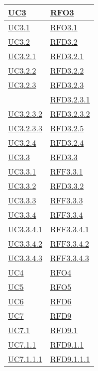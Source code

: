 \begin{longtable}{|>{\centering}m{5cm}|m{5cm}<{\centering}|}
\hyperref[UC3]{UC3} & \hyperlink{RFO3}{RFO3}\\ \hline
\hyperref[UC3.1]{UC3.1} & \hyperlink{RFO3.1}{RFO3.1}\\ \hline
\hyperref[UC3.2]{UC3.2} & \hyperlink{RFD3.2}{RFD3.2}\\ \hline
\hyperref[UC3.2.1]{UC3.2.1} & \hyperlink{RFD3.2.1}{RFD3.2.1}\\ \hline
\hyperref[UC3.2.2]{UC3.2.2} & \hyperlink{RFD3.2.2}{RFD3.2.2}\\ \hline
\hyperref[UC3.2.3]{UC3.2.3} & \hyperlink{RFD3.2.3}{RFD3.2.3}\\
& \hyperlink{RFD3.2.3.1}{RFD3.2.3.1}\\ \hline
\hyperref[UC3.2.3.2]{UC3.2.3.2} & \hyperlink{RFD3.2.3.2}{RFD3.2.3.2}\\ \hline
\hyperref[UC3.2.3.3]{UC3.2.3.3} & \hyperlink{RFD3.2.5}{RFD3.2.5}\\ \hline
\hyperref[UC3.2.4]{UC3.2.4} & \hyperlink{RFD3.2.4}{RFD3.2.4}\\ \hline
\hyperref[UC3.3]{UC3.3} & \hyperlink{RFD3.3}{RFD3.3}\\ \hline
\hyperref[UC3.3.1]{UC3.3.1} & \hyperlink{RFF3.3.1}{RFF3.3.1}\\ \hline
\hyperref[UC3.3.2]{UC3.3.2} & \hyperlink{RFD3.3.2}{RFD3.3.2}\\ \hline
\hyperref[UC3.3.3]{UC3.3.3} & \hyperlink{RFF3.3.3}{RFF3.3.3}\\ \hline
\hyperref[UC3.3.4]{UC3.3.4} & \hyperlink{RFF3.3.4}{RFF3.3.4}\\ \hline
\hyperref[UC3.3.4.1]{UC3.3.4.1} & \hyperlink{RFF3.3.4.1}{RFF3.3.4.1}\\ \hline
\hyperref[UC3.3.4.2]{UC3.3.4.2} & \hyperlink{RFF3.3.4.2}{RFF3.3.4.2}\\ \hline
\hyperref[UC3.3.4.3]{UC3.3.4.3} & \hyperlink{RFF3.3.4.3}{RFF3.3.4.3}\\ \hline
\hyperref[UC4]{UC4} & \hyperlink{RFO4}{RFO4}\\ \hline
\hyperref[UC5]{UC5} & \hyperlink{RFO5}{RFO5}\\ \hline
\hyperref[UC6]{UC6} & \hyperlink{RFD6}{RFD6}\\ \hline
\hyperref[UC7]{UC7} & \hyperlink{RFD9}{RFD9}\\ \hline
\hyperref[UC7.1]{UC7.1} & \hyperlink{RFD9.1}{RFD9.1}\\ \hline
\hyperref[UC7.1.1]{UC7.1.1} & \hyperlink{RFD9.1.1}{RFD9.1.1}\\ \hline
\hyperref[UC7.1.1.1]{UC7.1.1.1} & \hyperlink{RFD9.1.1.1}{RFD9.1.1.1}\\ \hline

\end{longtable}
